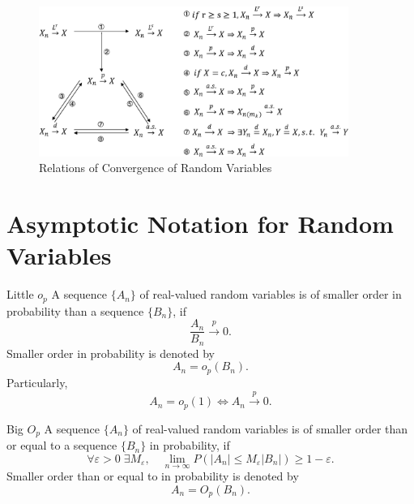 \begin{figure}[htp]
    \centering
    \includegraphics[width=0.9\textwidth]{./probability-theory/figures/relation-of-convergences.eps}
    \caption{Relations of Convergence of Random Variables}
\end{figure}

\section{Asymptotic Notation for Random Variables}

\begin{definition}{Little $o_p$}{}
    A sequence $\{A_n\}$ of real-valued random variables is of smaller order in probability than a sequence $\{B_n\}$, if
    \begin{equation}
        \frac{A_n}{B_n}\stackrel{p}{\rightarrow}0.
    \end{equation}
    Smaller order in probability is denoted by
    \begin{equation}
        A_n=o_p(B_n).
    \end{equation}
    Particularly,
    \begin{equation}
        A_n=o_p(1)\iff A_n\stackrel{p}{\rightarrow}0.
    \end{equation}
\end{definition}

\begin{definition}{Big $O_p$}{}
    A sequence $\{A_n\}$ of real-valued random variables is of smaller order than or equal to a sequence $\{B_n\}$ in probability, if
    \begin{equation}
        \forall\varepsilon>0\;\exists M_\varepsilon,\quad\lim_{n\rightarrow\infty} P\left(|A_n|\leq M_\varepsilon|B_n|\right)\geq 1-\varepsilon.
    \end{equation}
    Smaller order than or equal to in probability is denoted by
    \begin{equation}
        A_n=O_p(B_n).
    \end{equation}
\end{definition}

\begin{note}

\end{note}

